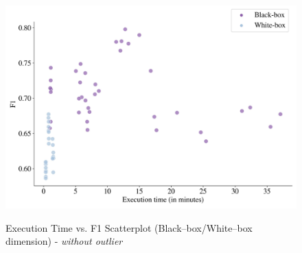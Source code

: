 \begin{figure}[H]
    \centering
    \caption{Execution Time vs. F1 Scatterplot (Black--box/White--box dimension) - \textit{without outlier}}\vspace{0.5em}
    \label{fig:scattertimebbwb}\
    \includegraphics[width=140mm]{Figures/Scatterplot_execution_time_F1_wo_outliers_BB_WB.jpg}

    \vspace{-1em}
\end{figure}


